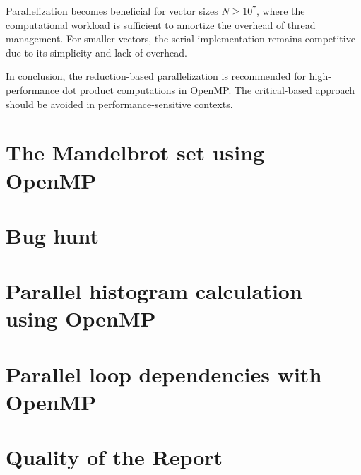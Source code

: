 \documentclass[unicode,11pt,a4paper,oneside,numbers=endperiod,openany]{scrartcl}
\begin{document}
Parallelization becomes beneficial for vector sizes $N \geq 10^7$, where the computational workload is sufficient to amortize the overhead of thread management. For smaller vectors, the serial implementation remains competitive due to its simplicity and lack of overhead.

In conclusion, the reduction-based parallelization is recommended for high-performance dot product computations in OpenMP. The critical-based approach should be avoided in performance-sensitive contexts.

\section{The Mandelbrot set using OpenMP }

\section{Bug hunt }

\section{Parallel histogram calculation using OpenMP }

\section{Parallel loop dependencies with OpenMP }

\section{Quality of the Report }
\end{document}
